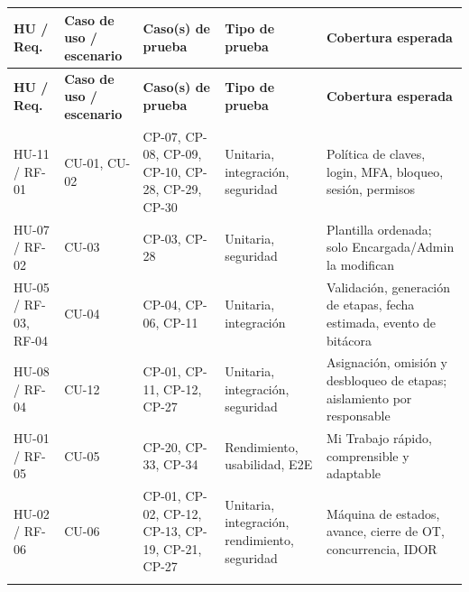 \documentclass[11pt,a4paper]{article}
\begin{document}
\begingroup\small
\begin{longtable}{@{}>{\raggedright\arraybackslash\hspace{0pt}}p{}>{\raggedright\arraybackslash\hspace{0pt}}p{}>{\raggedright\arraybackslash\hspace{0pt}}p{}>{\raggedright\arraybackslash\hspace{0pt}}p{}>{\raggedright\arraybackslash\hspace{0pt}}p{}@{}}
\toprule
\textbf{HU / Req.} & \textbf{Caso de uso / escenario} & \textbf{Caso(s) de prueba} & \textbf{Tipo de prueba} & \textbf{Cobertura esperada} \\ \midrule
\endfirsthead
\toprule
\textbf{HU / Req.} & \textbf{Caso de uso / escenario} & \textbf{Caso(s) de prueba} & \textbf{Tipo de prueba} & \textbf{Cobertura esperada} \\ \midrule
\endhead
\bottomrule
\endlastfoot
\mbox{HU-11} / \mbox{RF-01} & \mbox{CU-01}, \mbox{CU-02} & \mbox{CP-07}, \mbox{CP-08}, \mbox{CP-09}, \mbox{CP-10}, \mbox{CP-28}, \mbox{CP-29}, \mbox{CP-30} & Unitaria, integración, seguridad & Política de claves, login, MFA, bloqueo, sesión, permisos \\ \addlinespace[0.25em]
\mbox{HU-07} / \mbox{RF-02} & \mbox{CU-03} & \mbox{CP-03}, \mbox{CP-28} & Unitaria, seguridad & Plantilla ordenada; solo Encargada/Admin la modifican \\ \addlinespace[0.25em]
\mbox{HU-05} / \mbox{RF-03}, \mbox{RF-04} & \mbox{CU-04} & \mbox{CP-04}, \mbox{CP-06}, \mbox{CP-11} & Unitaria, integración & Validación, generación de etapas, fecha estimada, evento de bitácora \\ \addlinespace[0.25em]
\mbox{HU-08} / \mbox{RF-04} & \mbox{CU-12} & \mbox{CP-01}, \mbox{CP-11}, \mbox{CP-12}, \mbox{CP-27} & Unitaria, integración, seguridad & Asignación, omisión y desbloqueo de etapas; aislamiento por responsable \\ \addlinespace[0.25em]
\mbox{HU-01} / \mbox{RF-05} & \mbox{CU-05} & \mbox{CP-20}, \mbox{CP-33}, \mbox{CP-34} & Rendimiento, usabilidad, E2E & Mi Trabajo rápido, comprensible y adaptable \\ \addlinespace[0.25em]
\mbox{HU-02} / \mbox{RF-06} & \mbox{CU-06} & \mbox{CP-01}, \mbox{CP-02}, \mbox{CP-12}, \mbox{CP-13}, \mbox{CP-19}, \mbox{CP-21}, \mbox{CP-27} & Unitaria, integración, rendimiento, seguridad & Máquina de estados, avance, cierre de OT, concurrencia, IDOR \\ \addlinespace[0.25em]

\end{longtable}
\end{document}
